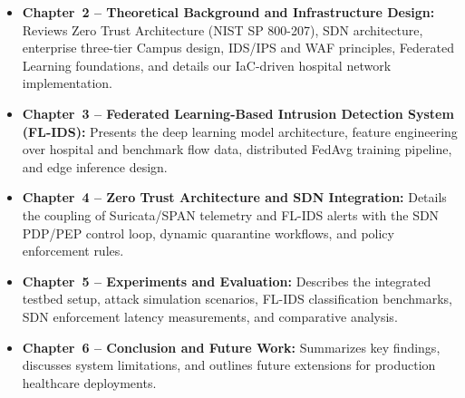 \begin{itemize}[leftmargin=1.8em, itemsep=5pt]
  \item \textbf{Chapter~2 -- Theoretical Background and Infrastructure Design:} Reviews Zero Trust Architecture (NIST SP 800-207), SDN architecture, enterprise three-tier Campus design, IDS/IPS and WAF principles, Federated Learning foundations, and details our IaC-driven hospital network implementation.
  \item \textbf{Chapter~3 -- Federated Learning-Based Intrusion Detection System (FL-IDS):} Presents the deep learning model architecture, feature engineering over hospital and benchmark flow data, distributed FedAvg training pipeline, and edge inference design.
  \item \textbf{Chapter~4 -- Zero Trust Architecture and SDN Integration:} Details the coupling of Suricata/SPAN telemetry and FL-IDS alerts with the SDN PDP/PEP control loop, dynamic quarantine workflows, and policy enforcement rules.
  \item \textbf{Chapter~5 -- Experiments and Evaluation:} Describes the integrated testbed setup, attack simulation scenarios, FL-IDS classification benchmarks, SDN enforcement latency measurements, and comparative analysis.
  \item \textbf{Chapter~6 -- Conclusion and Future Work:} Summarizes key findings, discusses system limitations, and outlines future extensions for production healthcare deployments.
\end{itemize}
